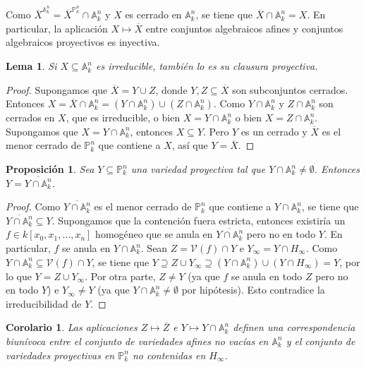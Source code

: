 \documentclass[a4paper,10pt]{book}
\newtheorem{cor}[thm]{Corolario}
\newtheorem{lem}[thm]{Lema}
\newtheorem{prop}[thm]{Proposición}
\newcommand{\AAA}{\mathbb A}
\newcommand{\PP}{\mathbb P}
\newcommand{\Ank}{\AAA^n_k}
\newcommand{\Pnk}{\PP^n_k}
\newcommand{\VV}{{\mathcal V}}
\begin{document}
 
Como ${\overline X}^{\Ank}={\overline X}^{\Pnk}\cap \Ank$ y $X$ es cerrado en $\Ank$, se tiene que ${\overline X}\cap\Ank=X$. En particular, la aplicación $X\mapsto\overline X$ entre conjuntos algebraicos afines y conjuntos algebraicos proyectivos es inyectiva.

\begin{lem} Si $X\subseteq\Ank$ es irreducible, también lo es su clausura proyectiva.
 \end{lem}

\begin{proof}
 Supongamos que $\overline X=Y\cup Z$, donde $Y,Z\subseteq\overline X$ son subconjuntos cerrados. Entonces $X={\overline X}\cap\Ank=(Y\cap\Ank)\cup(Z\cap\Ank)$. Como $Y\cap\Ank$ y $Z\cap\Ank$ son cerrados en $X$, que es irreducible, o bien $X=Y\cap\Ank$ o bien $X=Z\cap\Ank$. Supongamos que $X=Y\cap\Ank$, entonces $X\subseteq Y$. Pero $Y$ es un cerrado y $\overline X$ es el menor cerrado de $\Pnk$ que contiene a $X$, así que $Y=\overline X$.
\end{proof}


\begin{prop}
 Sea $Y\subseteq\Pnk$ una variedad proyectiva tal que $Y\cap \Ank\neq\emptyset$. Entonces $Y=\overline{Y\cap\Ank}$.
\end{prop}

\begin{proof}
 Como $\overline{Y\cap\Ank}$ es el menor cerrado de $\Pnk$ que contiene a $Y\cap\Ank$, se tiene que $\overline{Y\cap\Ank}\subseteq Y$. Supongamos que la contención fuera estricta, entonces existiría un $f\in k[x_0,x_1,\ldots,x_n]$ homogéneo que se anula en $\overline{Y\cap\Ank}$ pero no en todo $Y$. En particular, $f$ se anula en $Y\cap\Ank$. Sean $Z=\VV(f)\cap Y$ e $Y_\infty=Y\cap H_\infty$. Como $Y\cap\Ank\subseteq\VV(f)\cap Y$, se tiene que $Y\supseteq Z\cup Y_\infty\supseteq (Y\cap\Ank)\cup(Y\cap H_\infty)=Y$, por lo que $Y=Z\cup Y_\infty$. Por otra parte, $Z\neq Y$ (ya que $f$ se anula en todo $Z$ pero no en todo $Y$) e $Y_\infty\neq Y$ (ya que $Y\cap\Ank\neq\emptyset$ por hipótesis). Esto contradice la irreducibilidad de $Y$. 
\end{proof}

\begin{cor}
 Las aplicaciones $Z\mapsto\overline Z$ e $Y\mapsto Y\cap\Ank$ definen una correspondencia biunívoca entre el conjunto de variedades afines no vacías en $\Ank$ y el conjunto de variedades proyectivas en $\Pnk$ no contenidas en $H_\infty$.
\end{cor}
\end{document}
